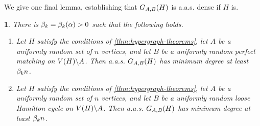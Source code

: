 \documentclass[11pt,english]{article}
\theoremstyle{plain}
\theoremstyle{definition}
\theoremstyle{definition}
\theoremstyle{plain}
\theoremstyle{plain}
\theoremstyle{plain}
\newtheorem{lem}[thm]{\protect\lemmaname}
\theoremstyle{plain}
\theoremstyle{remark}
\theoremstyle{remark}
\let\originalleft\left
\let\originalright\right
\renewcommand{\left}{\mathopen{}\mathclose\bgroup\originalleft}
\renewcommand{\right}{\aftergroup\egroup\originalright}
\providecommand{\lemmaname}{Lemma}
\begin{document}
We give one final lemma, establishing that $G_{A,B}\left(H\right)$ is a.a.s.{} dense if $H$ is.
\begin{lem}
\label{lem:hypergraph-bipartite-degree-transfer}There is $\a=\a\left(\alpha\right)>0$ such that the following
holds.

\begin{enumerate}[topsep=0px,label=(\alph*)]

\item{\label{itm:hypergraph-bipartite-matching-degree-transfer}Let $H$ satisfy the conditions of \ref{thm:hypergraph-theorems},
let $A$ be a uniformly random set of $n$ vertices, and let $B$
be a uniformly random perfect matching on $V\left(H\right)\backslash A$.
Then a.a.s.{} $G_{A,B}\left(H\right)$ has minimum degree at least $\beta_k n$.}

\item{\label{itm:hypergraph-bipartite-cycle-degree-transfer}Let $H$ satisfy the conditions of \ref{thm:hypergraph-theorems},
let $A$ be a uniformly random set of $n$ vertices, and let $B$
be a uniformly random loose Hamilton cycle on $V\left(H\right)\backslash A$.
Then a.a.s.{} $G_{A,B}\left(H\right)$ has minimum degree at least $\beta_k n$.}

\end{enumerate}\end{lem}
\end{document}
